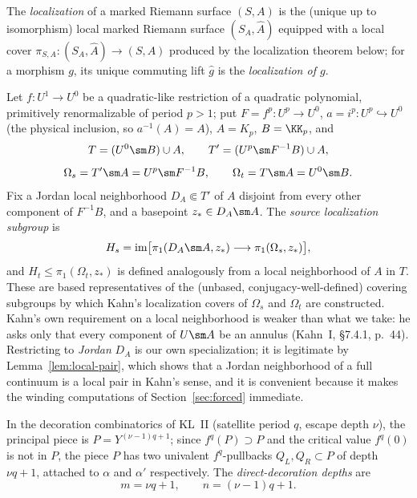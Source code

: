 \begin{definition}\label{def:localization}
The \emph{localization} of a marked Riemann surface \((S,A)\) is the
(unique up to isomorphism) local marked Riemann surface
\((S_A,\widehat A)\) equipped with a local cover
\(\pi_{S,A}\colon(S_A,\widehat A)\to(S,A)\) produced by the
localization theorem below; for a morphism \(g\), its unique commuting
lift \(\widehat g\) is the \emph{localization of \(g\)}.
\end{definition}

\begin{definition}\label{def:hs-ht}
Let \(f\colon U^1\to U^0\) be a quadratic-like restriction of a
quadratic polynomial, primitively renormalizable of period \(p>1\); put
\(F=f^p\colon U^p\to U^0\), \(a=i^p\colon U^p\hookrightarrow U^0\)
(the physical inclusion, so \(a^{-1}(A)=A\)), \(A=K_p\),
\(B=\KK_p\), and
\[
 T=(U^0\sm B)\cup A,\qquad T'=(U^p\sm F^{-1}B)\cup A,
\]
\[
 \Omega_s=T'\sm A=U^p\sm F^{-1}B,\qquad
 \Omega_t=T\sm A=U^0\sm B.
\]
Fix a Jordan local neighborhood \(D_A\Subset T'\) of \(A\) disjoint
from every other component of \(F^{-1}B\), and a basepoint
\(z_*\in D_A\sm A\).  The \emph{source localization subgroup} is
\[
 H_s=\operatorname{im}\bigl[\pi_1(D_A\sm A,z_*)\longrightarrow
 \pi_1(\Omega_s,z_*)\bigr],
\]
and \(H_t\le\pi_1(\Omega_t,z_*)\) is defined analogously from a local
neighborhood of \(A\) in \(T\).  These are based representatives of the
(unbased, conjugacy-well-defined) covering subgroups by which Kahn's
localization covers of \(\Omega_s\) and \(\Omega_t\) are constructed.
Kahn's own requirement on a local neighborhood is weaker than what we
take: he asks only that every component of \(U\sm A\) be an annulus
(Kahn~I, \S7.4.1, p.~44).  Restricting to \emph{Jordan} \(D_A\) is our
own specialization; it is legitimate by Lemma~\ref{lem:local-pair},
which shows that a Jordan neighborhood of a full continuum is a local
pair in Kahn's sense, and it is convenient because it makes the
winding computations of Section~\ref{sec:forced} immediate.
\end{definition}

\begin{definition}\label{def:kl-decoration}
In the decoration combinatorics of KL~II (satellite period \(q\),
escape depth \(\nu\)), the principal piece is \(P=Y^{(\nu-1)q+1}\);
since \(f^q(P)\supset P\) and the critical value \(f^q(0)\) is not in
\(P\), the piece \(P\) has two univalent \(f^q\)-pullbacks
\(Q_L,Q_R\subset P\) of depth \(\nu q+1\), attached to \(\alpha\) and
\(\alpha'\) respectively.  The \emph{direct-decoration depths} are
\[
 m=\nu q+1,\qquad n=(\nu-1)q+1 .
\]
\end{definition}